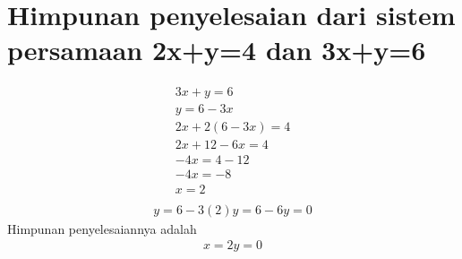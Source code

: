 \documentclass[a4paper,12pt]{article}
\author{RifqiFadil Fahrial}
\begin{document}
\section{Himpunan penyelesaian dari sistem persamaan 2x+y=4 dan 3x+y=6}
\begin{align*}
  3x+y=6\\
  y=6-3x\\
  2x+2(6-3x)=4\\
  2x+12-6x=4\\
  -4x=4-12\\
  -4x=-8\\
  x=2\\
\end{align*}
\begin{align*}
  y=6-3(2)
  y=6-6
  y=0
\end{align*}
Himpunan penyelesaiannya adalah 
\begin{align*}
  x=2
  y=0
\end{align*}


  
\end{document}
